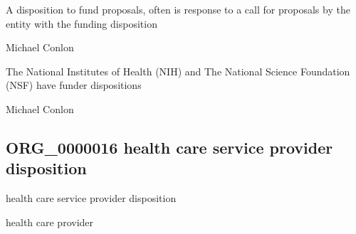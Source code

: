 \documentclass[letterpaper,10pt,english]{sphinxmanual}
\begin{document}
\begin{sphinxShadowBox}

\sphinxAtStartPar
A disposition to fund proposals, often is response to a call for proposals by the entity with the funding disposition
\end{sphinxShadowBox}

\begin{sphinxShadowBox}

\sphinxAtStartPar
Michael Conlon 
\end{sphinxShadowBox}

\begin{sphinxShadowBox}

\sphinxAtStartPar
The National Institutes of Health (NIH) and The National Science Foundation (NSF) have funder dispositions
\end{sphinxShadowBox}

\begin{sphinxShadowBox}

\sphinxAtStartPar
Michael Conlon 
\end{sphinxShadowBox}
\begin{quote}

\ignorespaces \end{quote}


\subsection{ORG\_0000016 \sphinxhyphen{} health care service provider disposition}
\label{\detokenize{doc-ORG_0000016:org-0000016-health-care-service-provider-disposition}}\label{\detokenize{doc-ORG_0000016:index-0}}\label{\detokenize{doc-ORG_0000016::doc}}
\begin{sphinxShadowBox}

\sphinxAtStartPar
health care service provider disposition
\end{sphinxShadowBox}

\begin{sphinxShadowBox}

\sphinxAtStartPar
health care provider
\end{sphinxShadowBox}
\end{document}
